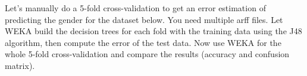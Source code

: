 \documentclass[fontsize=12pt, usenames, dvipsnames, headinclude, headsepline, footinclude, footsepline]{scrartcl}
\title{\normalfont{\bfseries{Machine Learning: Homework 6}}}
\author{Laurent \textsc{Hayez}}
\date{\today}
\begin{document}
\renewcommand{\labelitemi}{\textbullet}



\maketitle




\begin{exo}
  Let’s manually do a 5-fold cross-validation to get an error estimation of predicting the gender for the
  dataset below. You need multiple arff files. Let WEKA build the decision trees for each fold with the
  training data using the J48 algorithm, then compute the error of the test data. Now use WEKA for the whole
  5-fold cross-validation and compare the results (accuracy and confusion matrix).
\end{exo}
\end{document}
